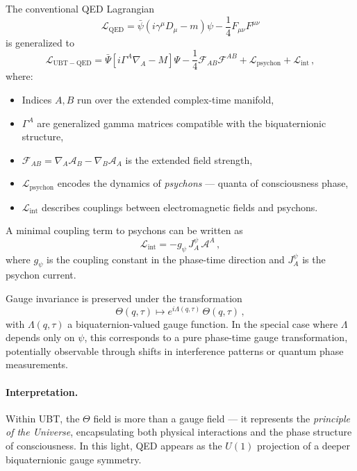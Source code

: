The conventional QED Lagrangian
\begin{equation}
\mathcal{L}_{\mathrm{QED}} = \bar{\psi}(i\gamma^\mu D_\mu - m)\psi - \frac14 F_{\mu\nu}F^{\mu\nu}
\end{equation}
is generalized to
\begin{equation}
\mathcal{L}_{\mathrm{UBT-QED}} = \bar{\Psi} \left[ i \Gamma^A \nabla_A - M \right] \Psi - \frac14 \mathcal{F}_{AB} \mathcal{F}^{AB} + \mathcal{L}_{\mathrm{psychon}} + \mathcal{L}_{\mathrm{int}} \,,
\end{equation}
where:
\begin{itemize}
    \item Indices \(A,B\) run over the extended complex-time manifold,
    \item \(\Gamma^A\) are generalized gamma matrices compatible with the biquaternionic structure,
    \item \(\mathcal{F}_{AB} = \nabla_A \mathcal{A}_B - \nabla_B \mathcal{A}_A\) is the extended field strength,
    \item \(\mathcal{L}_{\mathrm{psychon}}\) encodes the dynamics of \emph{psychons} — quanta of consciousness phase,
    \item \(\mathcal{L}_{\mathrm{int}}\) describes couplings between electromagnetic fields and psychons.
\end{itemize}

A minimal coupling term to psychons can be written as
\begin{equation}
\mathcal{L}_{\mathrm{int}} = - g_\psi \, J^\psi_A \, \mathcal{A}^A \,,
\end{equation}
where \(g_\psi\) is the coupling constant in the phase-time direction and \(J^\psi_A\) is the psychon current.

Gauge invariance is preserved under the transformation
\begin{equation}
\Theta(q,\tau) \mapsto e^{i \Lambda(q,\tau)} \, \Theta(q,\tau) \,,
\end{equation}
with \(\Lambda(q,\tau)\) a biquaternion-valued gauge function. In the special case where \(\Lambda\) depends only on \(\psi\), this corresponds to a pure phase-time gauge transformation, potentially observable through shifts in interference patterns or quantum phase measurements.

\paragraph{Interpretation.} Within UBT, the \(\Theta\) field is more than a gauge field — it represents the \emph{principle of the Universe}, encapsulating both physical interactions and the phase structure of consciousness. In this light, QED appears as the \(U(1)\) projection of a deeper biquaternionic gauge symmetry.

